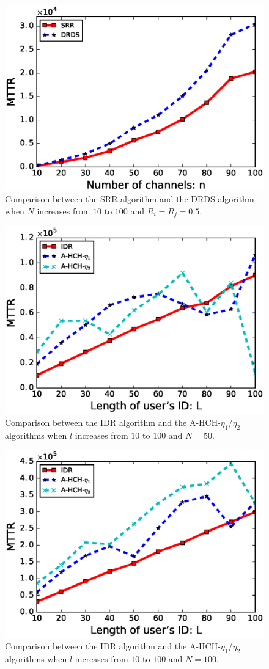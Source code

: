 \documentclass[10pt, conference, letterpaper]{IEEEtran}
\begin{document}
\begin{figure}[htbp]
\centering
\includegraphics[width=0.7\columnwidth]{fig1}
\caption{Comparison between the SRR algorithm and the DRDS algorithm when $N$ increases from $10$ to $100$ and $R_i =R_j = 0.5$.}
\label{result1}
\end{figure}


\begin{figure}[htbp]
\centering
\includegraphics[width=0.7\columnwidth]{fig4}
\caption{Comparison between the IDR algorithm and the A-HCH-$\eta_1$/$\eta_2$ algorithms when $l$ increases from $10$ to $100$ and $N = 50$.}
\label{result4}
\end{figure}

\begin{figure}[htbp]
\centering
\includegraphics[width=0.7\columnwidth]{fig3}
\caption{Comparison between the IDR algorithm and the A-HCH-$\eta_1$/$\eta_2$ algorithms when $l$ increases from $10$ to $100$ and $N=100$.}
\label{result3}
\end{figure}
\end{document}
